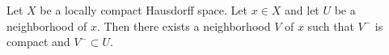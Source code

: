 Let $X$ be a locally compact Hausdorff space. Let $x \in X$ and let $U$ be a neighborhood of $x$. Then there exists a neighborhood $V$ of $x$ such that $V^{-}$ is compact and $V^{-} \subset U$.